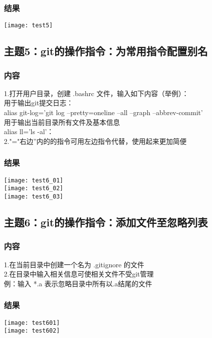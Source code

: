 \documentclass{article}
\begin{document}
\subsubsection{结果}  
\texttt{[image: test5]}\\
\subsection{主题5：git的操作指令：为常用指令配置别名}  
\subsubsection{内容}
1.打开用户目录，创建 .bashrc 文件，输入如下内容（举例）：\\
用于输出git提交日志：\\
alias git-log='git log --pretty=oneline --all --graph --abbrev-commit'\\
用于输出当前目录所有文件及基本信息\\
alias ll='ls -al'：\\
2."="右边''内的的指令可用左边指令代替，使用起来更加简便
\subsubsection{结果}  
\texttt{[image: test6\_01]}\\
\texttt{[image: test6\_02]}\\
\texttt{[image: test6\_03]}\\
\vspace{1cm}
\subsection{主题6：git的操作指令：添加文件至忽略列表}  
\subsubsection{内容}
1.在当前目录中创建一个名为 .gitignore 的文件\\
2.在目录中输入相关信息可使相关文件不受git管理\\
例：输入 *.a  表示忽略目录中所有以.a结尾的文件
\subsubsection{结果}  
\texttt{[image: test601]}\\
\texttt{[image: test602]}\\
\vspace{1cm}
\end{document}
